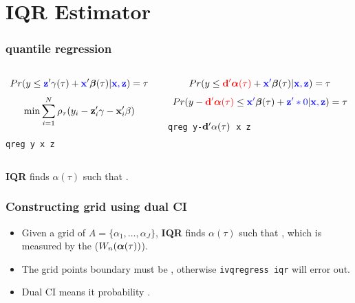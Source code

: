 \documentclass[11pt]{beamer}
\begin{document}
\section{IQR Estimator}
\begin{frame}
  \frametitle{ quantile regression}
  \begin{columns}

    \begin{column}{0.4\textwidth}
      \begin{center}

      \big\Downarrow
      $$
      Pr( y \le {\color{blue}{\mathbf{z}}}'\gamma(\tau) +
      {\color{blue}{\mathbf{x}}}'\boldsymbol{\beta}(\tau)|{\color{blue}{\mathbf{x}, \mathbf{z}}}) = \tau
	$$
      \big\Downarrow
      $$
	\min \sum_{i=1}^N \rho_{\tau}(y_i - \mathbf{z}_i'\gamma - \mathbf{x}_i'\beta)
	$$
      \Big\Downarrow

      {\tt qreg y x z}
  \end{center}
    \end{column}

    \begin{column}{0.6\textwidth}
      \begin{center}

      \big\Downarrow
      $$
	Pr( y \le {\color{red}{\mathbf{d}'\boldsymbol{\alpha}(\tau)}} + {\color{blue}{\mathbf{x}'}}\boldsymbol{\beta}(\tau)
	|{\color{blue}{\mathbf{x}, \mathbf{z}}}) = \tau
	$$
	\big\Updownarrow
	$$
	Pr( y - {\color{red}{\mathbf{d}'\boldsymbol{\alpha}(\tau)}}\le  {\color{blue}{\mathbf{x}'}}\boldsymbol{\beta}(\tau) +
	{\color{blue}{\mathbf{z}'*0}}|{\color{blue}{\mathbf{x}, \mathbf{z}}}) = \tau
	$$
	\Big\Downarrow 

      {\tt qreg y-$\mathbf{d}'\alpha(\tau)$ x z}
  \end{center}
    \end{column}
  \end{columns}

  \vskip 0.5cm
  {\bf IQR} finds $\alpha(\tau)$ such that .
\end{frame}

\begin{frame}
  \frametitle{Constructing grid using dual CI}

\begin{itemize}
    \setlength\itemsep{1em}
  \item Given a grid of $A = \{\alpha_1, \ldots, \alpha_J\}$, {\bf IQR} finds
    $\alpha(\tau)$ such that , which is measured by the 
    ($W_n(\boldsymbol{\alpha}(\tau))$).
  
  \item The grid points boundary must be , otherwise {\tt ivqregress iqr} will error out.

  \item Dual CI means it  probability \citep{chernozhukov2008}.
\end{itemize}
\end{frame}
\end{document}
